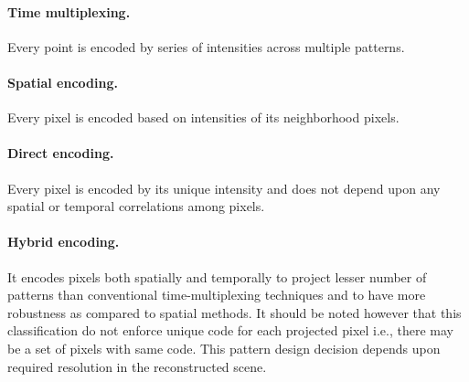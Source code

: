 \paragraph{Time multiplexing.}Every point is encoded by series of intensities across multiple patterns.
\paragraph{Spatial encoding.}Every pixel is encoded based on intensities of its neighborhood pixels. 
\paragraph{Direct encoding.}Every pixel is encoded by its unique intensity and does not depend upon any spatial or temporal correlations among pixels.
\paragraph{Hybrid encoding.}It encodes pixels both spatially and temporally to project  lesser number of patterns than conventional time-multiplexing techniques and to have more robustness as compared to spatial methods.\newline \newline
\noindent
It should be noted however that this classification do not enforce unique code for each projected pixel i.e., there may be a set of pixels with same code. This pattern design decision depends upon required resolution in the reconstructed scene.

